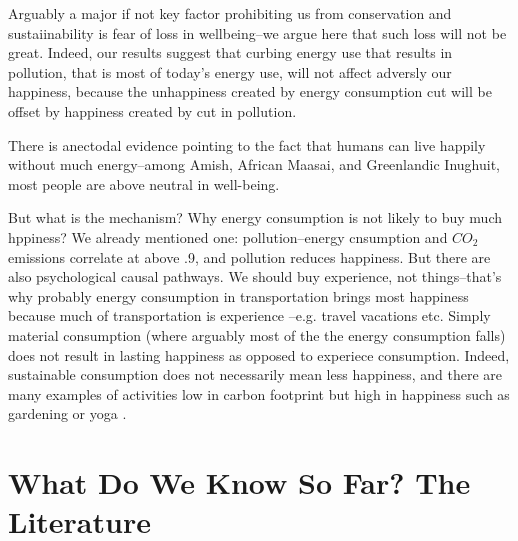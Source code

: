 \documentclass[10pt, letterpaper]{article}
\begin{document}
\begin{spacing}{1.4}

Arguably a major if not key factor prohibiting us from conservation and
sustaiinability is fear of loss in wellbeing--we argue here that such loss will
not be great. Indeed, our results suggest that curbing energy use that results
in pollution, that is most of today's energy use, will not affect adversly our
happiness, because the unhappiness created by energy consumption cut will be
offset by happiness created by cut in pollution.  

There is anectodal evidence pointing to the fact that humans can live happily
without much energy--among Amish, African Maasai, and Greenlandic Inughuit, most
people are above neutral in well-being.

But what is the mechanism? Why energy consumption is not likely to buy much
hppiness? We already mentioned one: pollution--energy cnsumption and $CO_2$
emissions correlate at above .9, and pollution reduces happiness. But there are
also psychological causal pathways.
We should buy experience, not things--that's why probably energy
consumption in transportation brings most happiness because much of
transportation is experience --e.g. travel vacations etc. 
Simply material consumption (where
arguably most of the  the energy consumption falls) does not result in lasting
happiness as opposed to experiece consumption. Indeed, sustainable consumption
does not necessarily mean less happiness, and there are many examples of
activities low in carbon footprint but high in happiness such as gardening or
yoga \citep{madjar06}. 


\section{What Do We Know So Far? The Literature}



\end{spacing}
\end{document}
